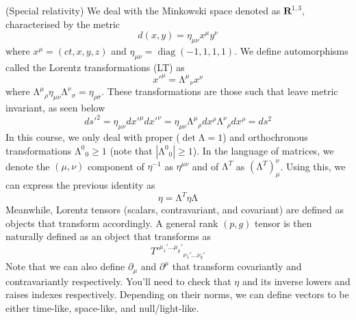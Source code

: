 \vspace{2ex}
\begin{defi}
(Special relativity) We deal with the Minkowski space denoted as ${\bm R}^{1,3}$, characterised by the metric 
	\[d(x,y)=\eta _{\mu \nu }x^{\mu }y^{\nu }\]
	where $x^{\mu }=(ct,x,y,z)$ and $\eta_{\mu \nu }=\mathop{\mathrm{diag}}(-1,1,1,1)$. We define automorphisms called the Lorentz transformations (LT) as
	\[x'^{\mu }=\mathrm{\Lambda }^{\mu }{}_{\nu }x^{\nu }\]
	where $\mathrm{\Lambda }^{\mu }{}_{\rho }\eta _{\mu \nu }\mathrm{\Lambda }^{\nu }{}_{\sigma }=\eta _{\rho \sigma }$. These transformations are those such that leave metric invariant, as seen below
	\[ds'^2=\eta _{\mu \nu }dx'^{\mu }dx'^{\nu }=\eta _{\mu \nu }\mathrm{\Lambda }^{\mu }{}_{\rho }dx^{\rho }\mathrm{\Lambda }^{\nu }{}_{\rho }dx^{\rho }=ds^2\]
	In this course, we only deal with proper ($\mathop{\mathrm{det}}\mathrm{\Lambda }=1$) and orthochronous transformations $\mathrm{\Lambda }^{0}{}_{0}\ge 1$ (note that $|\mathrm{\Lambda }^{0}{}_{0}|\ge 1$). In the language of matrices, we denote the $(\mu ,\nu )$ component of $\eta^{-1} $ as $\eta ^{\mu \nu }$ and of $\mathrm{\Lambda }^{T}$ as $(\mathrm{\Lambda }^{T})^{\nu }_{\mu }$. Using this, we can express the previous identity as
\[\eta =\mathrm{\Lambda }^{T}\eta \mathrm{\Lambda }\]
	Meanwhile, Lorentz tensors (scalars, contravariant, and covariant) are defined as objects that transform accordingly. A general rank $(p,g)$ tensor is then naturally defined as an object that transforms as
	\[T'^{\mu_1'\ldots \mu_{p}'}{}_{\nu_1'\ldots \nu _{q}'}\]
Note that we can also define $\partial _{\mu }$ and $\partial ^{\mu }$ that transform covariantly and contravariantly respectively. You'll need to check that $\eta $ and its inverse lowers and raises indexes respectively. Depending on their norms, we can define vectors to be either time-like, space-like, and null/light-like.
\end{defi}
\vspace{2ex}

